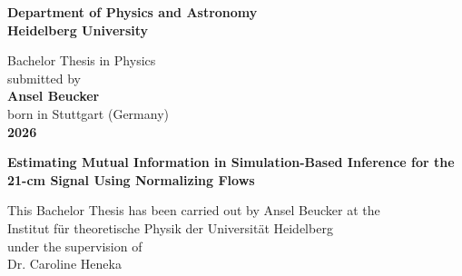 

\begin{titlepage}
\begin{center}
 
\Large\textbf{Department of Physics and Astronomy\\
Heidelberg University}

\vspace{18cm}

\normalsize
Bachelor Thesis in Physics\\
submitted by\\
\vspace{0.5cm}
\Large\textbf{Ansel Beucker}\\
\normalsize
\vspace{0.5cm}
born in Stuttgart (Germany)\\
\vspace{0.5cm}
\Large\textbf{2026}
\normalsize

\newpage




\Large\textbf{Estimating Mutual Information in Simulation-Based Inference for the 21-cm Signal Using Normalizing Flows}

\vspace{18cm}

\normalsize
This Bachelor Thesis has been carried out by Ansel Beucker at the\\
Institut für theoretische Physik der Universität Heidelberg\\
under the supervision of\\
Dr. Caroline Heneka

\vfill
\end{center}

\end{titlepage}

